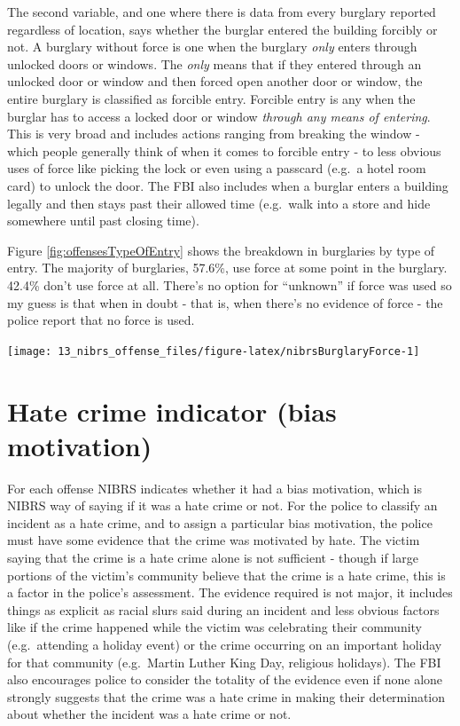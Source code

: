 \documentclass[
]{krantz}
\let\origfigure\figure
\let\endorigfigure\endfigure
\renewenvironment{figure}[1][2] {
    \expandafter\origfigure\expandafter[H]
} {
    \endorigfigure
}
\begin{document}
The second variable, and one where there is data from every
burglary reported regardless of location, says whether the
burglar entered the building forcibly or not. A burglary
without force is one when the burglary \emph{only} enters
through unlocked doors or windows. The \emph{only} means
that if they entered through an unlocked door or window and
then forced open another door or window, the entire burglary
is classified as forcible entry. Forcible entry is any when
the burglar has to access a locked door or window
\emph{through any means of entering}. This is very broad and
includes actions ranging from breaking the window - which
people generally think of when it comes to forcible entry -
to less obvious uses of force like picking the lock or even
using a passcard (e.g.~a hotel room card) to unlock the
door. The FBI also includes when a burglar enters a building
legally and then stays past their allowed time (e.g.~walk
into a store and hide somewhere until past closing time).

Figure \ref{fig:offensesTypeOfEntry} shows the breakdown in
burglaries by type of entry. The majority of burglaries,
57.6\%, use force at some point in the burglary. 42.4\%
don't use force at all. There's no option for ``unknown'' if
force was used so my guess is that when in doubt - that is,
when there's no evidence of force - the police report that
no force is used.

\begin{figure}

{\centering \texttt{[image: 13\_nibrs\_offense\_files/figure-latex/nibrsBurglaryForce-1]} 

}

\caption{The annual percent of burglaries, by whether entry used force, 1991-2022.}\label{fig:nibrsBurglaryForce}
\end{figure}

\section{Hate crime indicator (bias
motivation)}\label{hate-crime-indicator-bias-motivation}

For each offense NIBRS indicates whether it had a bias
motivation, which is NIBRS way of saying if it was a hate
crime or not. For the police to classify an incident as a
hate crime, and to assign a particular bias motivation, the
police must have some evidence that the crime was motivated
by hate. The victim saying that the crime is a hate crime
alone is not sufficient - though if large portions of the
victim's community believe that the crime is a hate crime,
this is a factor in the police's assessment. The evidence
required is not major, it includes things as explicit as
racial slurs said during an incident and less obvious
factors like if the crime happened while the victim was
celebrating their community (e.g.~attending a holiday event)
or the crime occurring on an important holiday for that
community (e.g.~Martin Luther King Day, religious holidays).
The FBI also encourages police to consider the totality of
the evidence even if none alone strongly suggests that the
crime was a hate crime in making their determination about
whether the incident was a hate crime or not.
\end{document}
